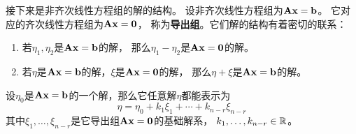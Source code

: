 接下来是非齐次线性方程组的解的结构。
设非齐次线性方程组为$\mathbf{A}\mathbf{x}=\mathbf{b}$。
它对应的齐次线性方程组为$\mathbf{A}\mathbf{x}=\mathbf{0}$，
称为\textbf{导出组}。它们解的结构有着密切的联系：
\begin{enumerate}
  \item
  若$\eta_1,\eta_2$是$\mathbf{A}\mathbf{x}=\mathbf{b}$的解，
  那么$\eta_1-\eta_2$是$\mathbf{A}\mathbf{x}=\mathbf{0}$的解。
  \item
  若$\eta$是$\mathbf{A}\mathbf{x}=\mathbf{b}$的解，$\xi$是$\mathbf{A}\mathbf{x}=\mathbf{0}$的解，
  那么$\eta+\xi$是$\mathbf{A}\mathbf{x}=\mathbf{b}$的解。
\end{enumerate}

\begin{theorem}
  设$\eta_0$是$\mathbf{A}\mathbf{x}=\mathbf{b}$的一个解，那么它任意解$\eta$都能表示为
  \[ \eta = \eta_0 + k_1\xi_1 + \cdots + k_{n-r}\xi_{n-r} \]
  其中$\xi_1,\dots,\xi_{n-r}$是它导出组$\mathbf{A}\mathbf{x}=\mathbf{0}$的基础解系，
  $k_1,\dots,k_{n-r} \in \mathbb{R}$。
\end{theorem}
